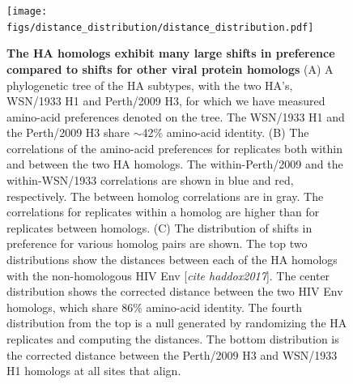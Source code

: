 \documentclass[9pt,twocolumn,twoside]{pnas-new}
\newcommand{\comment}[1]{{\color{red}[\textsl{#1}]}}
\begin{document}
\begin{figure}
\centering
\texttt{[image: figs/distance\_distribution/distance\_distribution.pdf]}
\caption{\label{fig:distance_distribution}
{\bf The HA homologs exhibit many large shifts in preference compared to shifts for other viral protein homologs}
(A) A phylogenetic tree of the HA subtypes, with the two HA's, WSN/1933 H1 and Perth/2009 H3, for which we have measured amino-acid preferences denoted on the tree. 
The WSN/1933 H1 and the Perth/2009 H3 share $\sim$42\% amino-acid identity.
(B) The correlations of the amino-acid preferences for replicates both within and between the two HA homologs. 
The within-Perth/2009 and the within-WSN/1933 correlations are shown in blue and red, respectively.
The between homolog correlations are in gray.
The correlations for replicates within a homolog are higher than for replicates between homologs.
(C) The distribution of shifts in preference for various homolog pairs are shown.
The top two distributions show the distances between each of the HA homologs with the non-homologous HIV Env \comment{cite haddox2017}. 
The center distribution shows the corrected distance between the two HIV Env homologs, which share 86\% amino-acid identity.
The fourth distribution from the top is a null generated by randomizing the HA replicates and computing the distances.
The bottom distribution is the corrected distance between the Perth/2009 H3 and WSN/1933 H1 homologs at all sites that align.
}
\end{figure}
\end{document}
